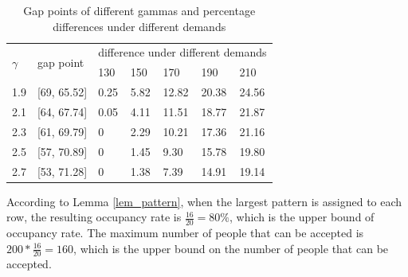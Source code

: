 \begin{table}[]
  \centering
  \caption{Gap points of different gammas and percentage differences under different demands}
\begin{tabular}{lllllll}
  \hline
  \multicolumn{1}{|l|}{\multirow{2}{*}{$\gamma$}} & \multicolumn{1}{l|}{\multirow{2}{*}{gap point}} & \multicolumn{5}{l|}{difference under different demands}   \\ 
  \cline{3-7} 
  \multicolumn{1}{|l|}{}                      & \multicolumn{1}{l|}{}                    & \multicolumn{1}{l|}{130} & \multicolumn{1}{l|}{150} & \multicolumn{1}{l|}{170} & \multicolumn{1}{l|}{190} & \multicolumn{1}{l|}{210} \\ 
  \hline
  \multicolumn{1}{|l|}{1.9}  & \multicolumn{1}{l|}{[69, 65.52]}  & \multicolumn{1}{l|}{0.25}  & \multicolumn{1}{l|}{5.82}  & \multicolumn{1}{l|}{12.82} & \multicolumn{1}{l|}{20.38} & \multicolumn{1}{l|}{24.56} \\ 
  \hline                                    
  \multicolumn{1}{|l|}{2.1}  & \multicolumn{1}{l|}{[64, 67.74]}  & \multicolumn{1}{l|}{0.05}  & \multicolumn{1}{l|}{4.11}  & \multicolumn{1}{l|}{11.51} & \multicolumn{1}{l|}{18.77} & \multicolumn{1}{l|}{21.87} \\ 
  \hline           
  \multicolumn{1}{|l|}{2.3}  & \multicolumn{1}{l|}{[61, 69.79]}  & \multicolumn{1}{l|}{0}  & \multicolumn{1}{l|}{2.29}  & \multicolumn{1}{l|}{10.21} & \multicolumn{1}{l|}{17.36} & \multicolumn{1}{l|}{21.16} \\ 
  \hline           
  \multicolumn{1}{|l|}{2.5}  & \multicolumn{1}{l|}{[57, 70.89]}  & \multicolumn{1}{l|}{0}  & \multicolumn{1}{l|}{1.45}  & \multicolumn{1}{l|}{9.30} & \multicolumn{1}{l|}{15.78} & \multicolumn{1}{l|}{19.80} \\ 
  \hline          
  \multicolumn{1}{|l|}{2.7}  & \multicolumn{1}{l|}{[53, 71.28]}  & \multicolumn{1}{l|}{0}  & \multicolumn{1}{l|}{1.38}  & \multicolumn{1}{l|}{7.39} & \multicolumn{1}{l|}{14.91} & \multicolumn{1}{l|}{19.14} \\ 
  \hline            
\end{tabular}
\end{table}

According to Lemma \ref{lem_pattern}, when the largest pattern is assigned to each row, the resulting occupancy rate is $\frac{16}{20} = 80\%$, which is the upper bound of occupancy rate. The maximum number of people that can be accepted is $200 * \frac{16}{20} = 160$, which is the upper bound on the number of people that can be accepted.


